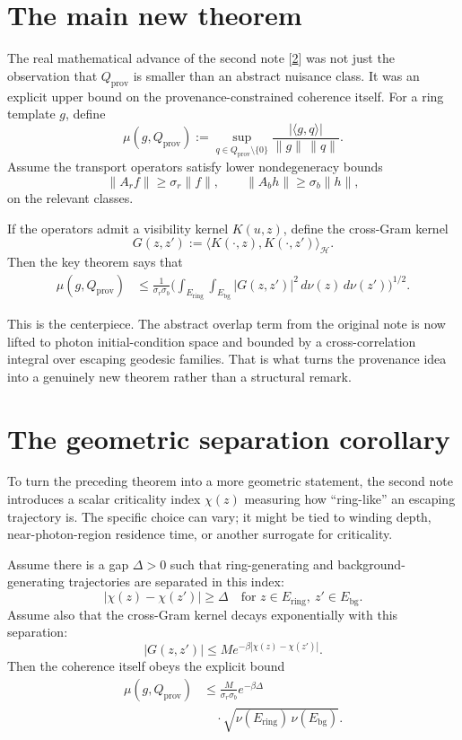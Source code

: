 \documentclass[10pt,letterpaper,twocolumn]{article}
\begin{document}
\section{The main new theorem}

The real mathematical advance of the second note [\hyperlink{ref-2}{2}] was not just the observation that
$Q_{\mathrm{prov}}$ is smaller than an abstract nuisance class. It was an explicit upper bound on the
provenance-constrained coherence itself. For a ring template $g$, define
\[
\mu(g,Q_{\mathrm{prov}})
:=
\sup_{q\in Q_{\mathrm{prov}}\setminus\{0\}}
\frac{|\langle g,q\rangle|}{\|g\|\,\|q\|}.
\]
Assume the transport operators satisfy lower nondegeneracy bounds
\[
\|A_r f\|\ge \sigma_r\|f\|,
\qquad
\|A_b h\|\ge \sigma_b\|h\|,
\]
on the relevant classes.

If the operators admit a visibility kernel $K(u,z)$, define the cross-Gram kernel
\[
G(z,z'):=\langle K(\cdot,z),K(\cdot,z')\rangle_{\mathcal H}.
\]
Then the key theorem says that
\begin{equation}
\begin{aligned}
\mu(g,Q_{\mathrm{prov}})
&\le
\frac{1}{\sigma_r\sigma_b}
\biggl(
\int_{E_{\mathrm{ring}}}\!\int_{E_{\mathrm{bg}}}
|G(z,z')|^2\,d\nu(z)\,d\nu(z')
\biggr)^{1/2}.
\end{aligned}
\end{equation}

This is the centerpiece. The abstract overlap term from the original note is now lifted to photon
initial-condition space and bounded by a cross-correlation integral over escaping geodesic families.
That is what turns the provenance idea into a genuinely new theorem rather than a structural remark.

\section{The geometric separation corollary}

To turn the preceding theorem into a more geometric statement, the second note introduces a scalar
criticality index $\chi(z)$ measuring how ``ring-like'' an escaping trajectory is. The specific choice can
vary; it might be tied to winding depth, near-photon-region residence time, or another surrogate for
criticality.

Assume there is a gap $\Delta>0$ such that ring-generating and background-generating trajectories are
separated in this index:
\[
|\chi(z)-\chi(z')|\ge \Delta
\quad
\text{for } z\in E_{\mathrm{ring}},\ z'\in E_{\mathrm{bg}}.
\]
Assume also that the cross-Gram kernel decays exponentially with this separation:
\[
|G(z,z')|\le M e^{-\beta |\chi(z)-\chi(z')|}.
\]
Then the coherence itself obeys the explicit bound
\begin{equation}
\begin{aligned}
\mu(g,Q_{\mathrm{prov}})
&\le
\frac{M}{\sigma_r\sigma_b}e^{-\beta\Delta} \\
&\quad \cdot \sqrt{\nu(E_{\mathrm{ring}})\,\nu(E_{\mathrm{bg}})}.
\end{aligned}
\end{equation}
\end{document}
